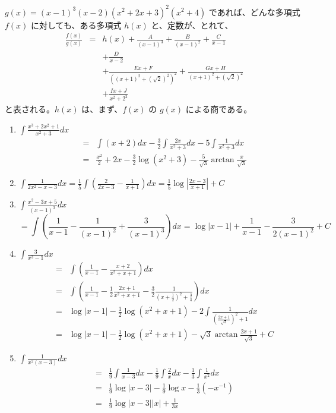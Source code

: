 \begin{eg}
$g(x) = (x-1)^3(x-2)(x^2+2x+3)^2(x^2+4)$ であれば、どんな多項式 $f(x)$ に対しても、ある多項式 $h(x)$ と、定数が、とれて、
\begin{eqnarray*}
\frac{f(x)}{g(x)} & = & h(x) + \frac{A}{(x-1)^3} + \frac{B}{(x-1)^2} + \frac{C}{x-1}\\
& & + \frac{D}{x-2} \\
& & + \frac{Ex + F}{((x+1)^2+(\sqrt{2})^2)^2} + \frac{Gx + H}{(x+1)^2+(\sqrt{2})^2}\\
& & + \frac{Ix+J}{x^2+2^2}
\end{eqnarray*}
と表される。$h(x)$ は、まず、$f(x)$ の $g(x)$ による商である。
\end{eg}

\begin{eg}
\begin{enumerate}
\item ${\displaystyle \int\frac{x^3+2x^2+1}{x^2+3}dx}$
\begin{eqnarray*}
\mbox{} &= & \int(x+2)dx -\frac32\int\frac{2x}{x^2+3}dx - 5\int\frac{1}{x^2+3}dx \\
   	& = & \frac{x^2}{2} + 2x -\frac32\log(x^2+3) - \frac5{\sqrt{3}}\arctan\frac{x}{\sqrt{3}}
\end{eqnarray*}
\item ${\displaystyle \int\frac{1}{2x^2-x-3}dx = \frac15\int\left(\frac{2}{2x-3} - \frac{1}{x+1}\right)dx = \frac15\log\left|\frac{2x-3}{x+1}\right| + C}$
\item ${\displaystyle \int\frac{x^2-3x+5}{(x-1)^3}dx}$
$$ = \int\left(\frac{1}{x-1} - \frac{1}{(x-1)^2} + \frac{3}{(x-1)^3}\right)dx = \log|x-1| + \frac{1}{x-1} - \frac{3}{2(x-1)^2} + C$$
\item ${\displaystyle \int\frac{3}{x^3-1}dx}$
\begin{eqnarray*}
\mbox{}& = & \int \left(\frac{1}{x-1} - \frac{x+2}{x^2+x+1}\right)dx\\
& = & \int\left(\frac{1}{x-1}-\frac12\frac{2x+1}{x^2+x+1}-\frac32\frac{1}{(x+\frac12)^2+\frac34}\right)dx \\
& = & \log|x-1| - \frac12\log(x^2+x+1) - 2\int\frac{1}{\left(\frac{2x+1}{\sqrt{3}}\right)^2+1}dx\\
& = & \log|x-1| -\frac12\log(x^2+x+1)-\sqrt{3}\arctan\frac{2x+1}{\sqrt{3}}+C
\end{eqnarray*}
\item ${\displaystyle \int\frac{1}{x^2(x-3)}dx}$
\begin{eqnarray*}
\mbox{} &= & \frac19\int\frac{1}{x-3}dx - \frac19\int\frac2xdx - \frac13\int\frac{1}{x^2}dx\\
& = & \frac19\log|x-3| -\frac{1}{9}\log x - \frac13(-x^{-1})\\
& = & \frac19\log{|x-3|}{|x|} + \frac{1}{3x}
\end{eqnarray*}
\end{enumerate}
\end{eg}

